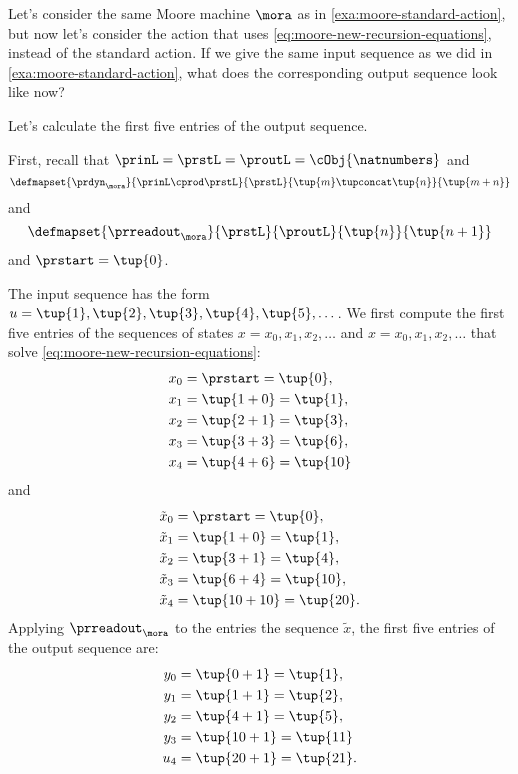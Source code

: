 \begin{example}
\label{exa:moore-non-standard-action-on-sequences}
Let's consider the same Moore machine $\mora$ as in \cref{exa:moore-standard-action}, but now let's consider the action that uses \cref{eq:moore-new-recursion-equations}, instead of the standard action. If we give the same input sequence as we did in \cref{exa:moore-standard-action}, what does the corresponding output sequence look like now?

Let's calculate the first five entries of the output sequence. 

First, recall that $\prinL = \prstL = \proutL = \cObj{\natnumbers}$
and 
\begin{equation}
\defmapset{
\prdyn_\mora
}{
\prinL \cprod \prstL
}{
\prstL
}{
\tup{m} \tupconcat \tup{n}
}{
\tup{m + n}
}
\end{equation}
and 
\begin{equation}
\defmapset{
\prreadout_\mora
}{
\prstL
}{
\proutL
}{
\tup{n}
}{
\tup{n+1}
}
\end{equation}
and $\prstart = \tup{0}$. 

The input sequence has the form $u = \tup{1}, \tup{2}, \tup{3}, \tup{4}, \tup{5}, \dots$. We first compute the first five entries of the sequences of states $x = x_0, x_1, x_2, \dots$ and $x = x_0, x_1, x_2, \dots$ that solve \cref{eq:moore-new-recursion-equations}:
\begin{align*}
x_0 &= \prstart = \tup{0}, \\
x_1 &= \tup{1 + 0} = \tup{1}, \\
x_2 &= \tup{2 + 1} = \tup{3}, \\
x_3 &= \tup{3 + 3} = \tup{6}, \\
x_4 &= \tup{4 + 6} = \tup{10}
\end{align*}
and
\begin{align*}
\tilde x_0 &= \prstart = \tup{0}, \\
\tilde x_1 &= \tup{1 + 0} = \tup{1}, \\
\tilde x_2 &= \tup{3 + 1} = \tup{4}, \\
\tilde x_3 &= \tup{6 + 4} = \tup{10}, \\
\tilde x_4 &= \tup{10 + 10} = \tup{20}.
\end{align*}
Applying $\prreadout_\mora$ to the entries the sequence $\tilde x$, the first five entries of the output sequence are:
\begin{align*}
y_0 &= \tup{0 + 1} = \tup{1}, \\
y_1 &= \tup{1 + 1} = \tup{2}, \\
y_2 &= \tup{4 + 1} = \tup{5}, \\
y_3 &= \tup{10 + 1} = \tup{11} \\
u_4 &= \tup{20 + 1} = \tup{21}.
\end{align*}
\end{example}


